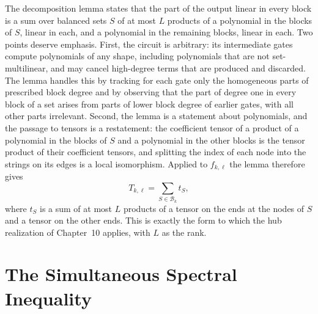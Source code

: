 \documentclass[11pt,letterpaper]{report}
\theoremstyle{plain}
\theoremstyle{definition}
\theoremstyle{remark}
\begin{document}
The decomposition lemma states that the part of the output linear in every block is a sum over balanced sets $S$ of at most $L$ products of a polynomial in the blocks of $S$, linear in each, and a polynomial in the remaining blocks, linear in each. Two points deserve emphasis. First, the circuit is arbitrary: its intermediate gates compute polynomials of any shape, including polynomials that are not set-multilinear, and may cancel high-degree terms that are produced and discarded. The lemma handles this by tracking for each gate only the homogeneous parts of prescribed block degree and by observing that the part of degree one in every block of a set arises from parts of lower block degree of earlier gates, with all other parts irrelevant. Second, the lemma is a statement about polynomials, and the passage to tensors is a restatement: the coefficient tensor of a product of a polynomial in the blocks of $S$ and a polynomial in the other blocks is the tensor product of their coefficient tensors, and splitting the index of each node into the strings on its edges is a local isomorphism. Applied to $f_{k,\ell}$ the lemma therefore gives
\[
T_{k,\ell}=\sum_{S\in\mathcal B_k}t_S,
\]
where $t_S$ is a sum of at most $L$ products of a tensor on the ends at the nodes of $S$ and a tensor on the other ends. This is exactly the form to which the hub realization of Chapter~10 applies, with $L$ as the rank.

\section{The Simultaneous Spectral Inequality}
\end{document}
